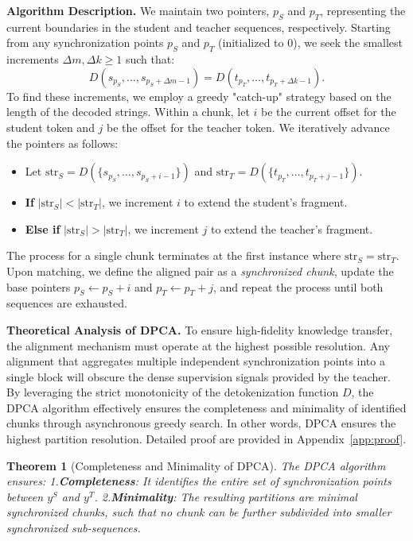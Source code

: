 \documentclass{article}
\theoremstyle{plain}
\newtheorem{theorem}{Theorem}[section]
\theoremstyle{definition}
\theoremstyle{remark}
\begin{document}
\textbf{Algorithm Description.} We maintain two pointers, $p_S$ and $p_T$, representing the current boundaries in the student and teacher sequences, respectively. Starting from any synchronization points $p_S$ and $p_T$ (initialized to $0$), we seek the smallest increments $\Delta m, \Delta k \ge 1$ such that:
\begin{equation}
D({s_{p_S}, \dots, s_{p_S + \Delta m - 1}}) = D({t_{p_T}, \dots, t_{p_T + \Delta k - 1}}).
\end{equation}
To find these increments, we employ a greedy "catch-up" strategy based on the length of the decoded strings. Within a chunk, let $i$ be the current offset for the student token and $j$ be the offset for the teacher token. We iteratively advance the pointers as follows:
\begin{itemize}\item Let $\text{str}_S = D(\{s_{p_S}, \dots, s_{p_S + i - 1}\})$ and $\text{str}_T = D(\{t_{p_T}, \dots, t_{p_T + j - 1}\})$.
\item \textbf{If} $|\text{str}_S| < |\text{str}_T|$, we increment $i$ to extend the student's fragment.
\item \textbf{Else if} $|\text{str}_S| > |\text{str}_T|$, we increment $j$ to extend the teacher's fragment.
\end{itemize}
The process for a single chunk terminates at the first instance where $\text{str}_S = \text{str}_T$. Upon matching, we define the aligned pair as a \textit{synchronized chunk}, update the base pointers $p_S \leftarrow p_S + i$ and $p_T \leftarrow p_T + j$, and repeat the process until both sequences are exhausted.

\textbf{Theoretical Analysis of DPCA.}
To ensure high-fidelity knowledge transfer, the alignment mechanism must operate at the highest possible resolution. Any alignment that aggregates multiple independent synchronization points into a single block will obscure the dense supervision signals provided by the teacher. By leveraging the strict monotonicity of the detokenization function $D$, the DPCA algorithm effectively ensures the completeness and minimality of identified chunks through asynchronous greedy search. In other words, DPCA ensures the highest partition resolution. Detailed proof are provided in Appendix~\ref{app:proof}.

\begin{theorem}[Completeness and Minimality of DPCA]
\label{thm:minimal_partition}
The DPCA algorithm ensures: 1.\textbf{Completeness}: It identifies the entire set of synchronization points between $y^S$ and $y^T$. 2.\textbf{Minimality}: The resulting partitions are minimal synchronized chunks, such that no chunk can be further subdivided into smaller synchronized sub-sequences.
\end{theorem}
\end{document}
